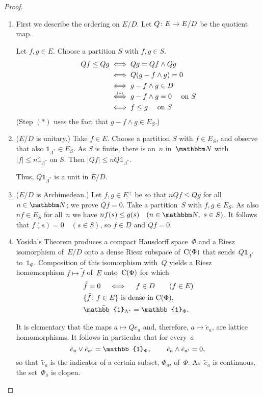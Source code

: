 \documentclass[main.tex]{subfiles}
\begin{document}
\begin{proof}
\begin{enumerate}[label=(\Roman*),leftmargin=*]
$D$ is easily seen to be a Riesz ideal in~$E$.
We are going to apply the Yosida Theorem to~$E/D$.
To this end, 
we prove~$E/D$
to be unitary and Archimedean.
%
\item \label{3.20-IV}
First we describe the ordering on $E/D$.
Let $Q\colon E\rightarrow E/D$ be the quotient map.

Let $f,g\in E$. 
Choose a partition $S$ with $f,g\in S$.
\begin{align*}
Qf \leq Qg 
& \iff Qg = Qf \wedge Qg \\
& \iff Q(g-f\wedge g)=0 \\
& \iff g-f\wedge g \in D \\
& \mathrel{\smash{ \stackrel{\scriptscriptstyle (*)}{\iff}}} g-f\wedge g =0\quad\text{ on }S \\
& \iff f\leq g\quad\text{ on }S
\end{align*}
(Step $(*)$ uses the fact that $g-f\wedge g\in E_S$.)
%
\item \label{3.20-V}
($E/D$ is unitary.)
Take $f\in E$.
Choose a partition $S$ with $f\in E_S$,
and observe that also
$\mathbb{1}_{\Lambda^*}\in E_S$.
As $S$ is finite, 
there is an~$n$ in~$\N$
with $|f|\leq n \mathbb{1}_{\Lambda^*}$ on $S$.
Then $|Qf|\leq n Q\mathbb{1}_{\Lambda^*}$.

Thus, $Q\mathbb{1}_{\Lambda^*}$ is a unit in $E/D$.
%
\item \label{3.20-VI}
($E/D$ is Archimedean.)
Let $f,g\in E^+$ be so that $nQf\leq Qg$ for all $n\in \N$;
we prove $Qf=0$.
Take a partition~$S$ with $f,g\in E_S$.
As also $nf\in E_S$
for all~$n$
we have $nf(s)\leq g(s)\quad(n\in \N,\ s\in S)$.
It follows that $f(s)=0\quad (s\in S)$,
so $f\in D$ and $Qf=0$.
%
\item \label{3.20-VII}
Yosida's Theorem produces a compact Hausdorff space~$\Phi$
and a Riesz isomorphism of~$E/D$ 
onto a dense Riesz subspace of~$\mathrm{C}(\Phi)$
that sends~$Q\mathbb{1}_{\Lambda^*}$ to~$\mathbb{1}_\Phi$.
Composition of this isomorphism with~$Q$ 
yields a Riesz homomorphism $f\mapsto \tilde{f}$
of~$E$ onto~$\mathrm{C}(\Phi)$ for which
\begin{alignat*}{2}
& \tilde{f} = 0 \quad \iff \quad f\in D\qquad (f\in E) \\
& \{ \tilde{f}\colon f\in E\} \htam{ is dense in } \Cont{\Phi}\htam{, } \\
& \tilde{\mathbb{1}}_{\Lambda^*} = \mathbb{1}_\Phi\htam{.}
\end{alignat*}

It is elementary that the maps $a\mapsto Qe_a$ 
and, therefore, $a\mapsto \tilde{e}_a$,
are lattice homomorphisms.
It follows in particular that for every~$a$
\begin{equation*}
\tilde{e}_a \vee \tilde{e}_{a'} = \mathbb{1}_\Phi\htam{, }
\qquad \tilde{e}_a \wedge \tilde{e}_{a'}=0\htam{, }
\end{equation*}
so that~$\tilde{e}_a$ is the indicator of a certain subset,
$\Phi_a$, of~$\Phi$.
As~$\tilde{e}_a$ is continuous,
the set~$\Phi_a$ is clopen.


\end{enumerate}
\end{proof}
\end{document}
